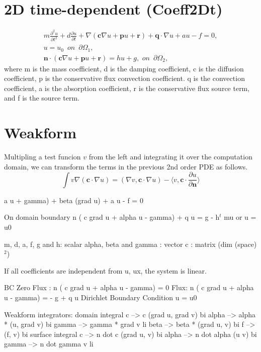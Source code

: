 \documentclass[11pt,a4paper,draft]{report}
\begin{document}
 

  
  \section{2D time-dependent (Coeff2Dt)}
  \begin{align}
  m\frac{\partial^2 u}{\partial t^2} +   d\frac{\partial u}{\partial t} + \nabla (\mathbf{c} \nabla u + \mathbf{p}u + \mathbf{r}) + \mathbf{q} \cdot \nabla u + au - f = 0, 
  \\  
  u = u_{0} \,\,\,on\,\,\,\partial \Omega_{1},
  \\
 \mathbf{n}\cdot (\mathbf{c} \nabla u + \mathbf{p}u + \mathbf{r}) = hu + g,\,\,on\,\,\,\partial \Omega_{2},
  \end{align}
where m is the mass coefficient, d is the damping coefficient, c is the diffusion coefficient, p is the conservative flux convection coefficient. q is the convection coefficient,  a is the absorption coefficient, r is the conservative flux source term, and f is the source term.

 \section{Weakform}
  Multipling a test funcion $v$ from the left and integrating it over the computation domain,  we can transform the terms in the previous 2nd order PDE as follows.
  \begin{equation}
 \int v \nabla (\mathbf{c} \cdot \nabla u) = (\nabla v,\mathbf{c} \cdot \nabla u) - \langle v, \mathbf{c} \cdot \frac{\partial u}{\partial \mathbf{n}} \rangle
  \end{equation}
  
  a u + gamma) 
              + beta (grad u) + a u - f = 0

  On domain boundary
     n ( c grad u + alpha u - gamma) + q u = g - h$^t$ mu
       or 
     u = u0  

    m, d, a, f, g and h: scalar
    alpha, beta and gamma : vector
    c  : matrix (dim (space) $^2$)

    If all coefficients are independent from u, ux,
    the system is linear.

    BC
     Zero Flux : 
        n ( c grad u + alpha u - gamma) = 0
     Flux: 
        n ( c grad u + alpha u - gamma) = - g + q u
     Dirichlet Boundary Condition
        u = u0

  Weakform integrators:
    domain integral
       c     -->  c (grad u, grad v)     bi
       alpha -->  alpha * (u, grad v)    bi
       gamma -->  gamma * grad v         li
       beta  -->  beta * (grad u, v)     bi
       f     -->  (f, v)                 bi
    surface integral
       c     -->   n dot c (grad u, v)   bi
       alpha -->   n dot alpha  (u v)    bi
       gamma -->   n dot gamma   v       li
 
\end{document}
